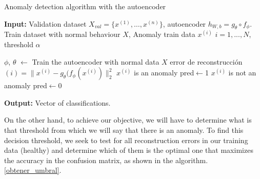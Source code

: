 \documentclass{iosart2c}
\begin{document}
\begin{algorithm}[h!]
\caption{Anomaly detection algorithm with the autoencoder}\label{autoencoder_anomalias}
\textbf{Input:} Validation dataset $X_{val}=\{x^{(1)},\ldots,x^{(n)}\}$, autoencoder $h_{W,b}=g_\theta \circ f_\phi$.\\ Train dataset with normal behaviour  $X$, Anomaly train data $x^{(i)}$ $i = 1,...,N$, threshold $\alpha$\\
\begin{algorithmic}[1]
\State $\phi$, $\theta$ $\xleftarrow{}$ Train the autoencoder with normal data $X$
    \State error de {reconstrucción}$(i) = \lVert x^{(i)} - g_\theta(f_\phi(x^{(i)})\rVert_2^2$ 
        \State$x^{(i)}$ is an anomaly
        \State pred$\xleftarrow{}$1
    \Else 
        \State$x^{(i)}$ is not an anomaly
        \State pred$\xleftarrow{}$0
    \EndIf
\EndFor
\end{algorithmic}
\textbf{Output:} Vector of classifications.\\
\end{algorithm}


On the other hand, to achieve our objective, we will have to determine what is that threshold from which we will say that there is an anomaly. To find this decision threshold, we seek to test for all reconstruction errors in our training data (healthy) and determine which of them is the optimal one that maximizes the accuracy in the confusion matrix, as shown in the algorithm. \ref{obtener_umbral}.
\end{document}
